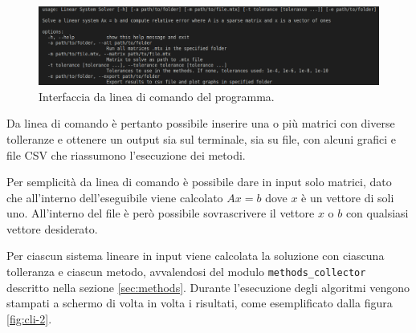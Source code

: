 \documentclass[12pt]{article}
\begin{document}
\begin{figure}[H]
    \begin{center}
    \includegraphics[width=\textwidth]{images/program-cli.png}
    \caption{Interfaccia da linea di comando del programma.}
    \label{fig:cli-1}
    \end{center}
\end{figure}

Da linea di comando è pertanto possibile inserire una o più matrici con diverse tolleranze e ottenere un output sia sul terminale, sia su file, con alcuni grafici e file CSV che riassumono l'esecuzione dei metodi.

\begin{shaded}
Per semplicità da linea di comando è possibile dare in input solo matrici, dato che all'interno dell'eseguibile viene calcolato $Ax = b$ dove $x$ è un vettore di soli uno. All'interno del file è però possibile sovrascrivere il vettore $x$ o $b$ con qualsiasi vettore desiderato.
\end{shaded}

Per ciascun sistema lineare in input viene calcolata la soluzione con ciascuna tolleranza e ciascun metodo, avvalendosi del modulo \texttt{methods\_collector} descritto nella sezione \ref{sec:methods}. Durante l'esecuzione degli algoritmi vengono stampati a schermo di volta in volta i risultati, come esemplificato dalla figura \ref{fig:cli-2}.
\end{document}
